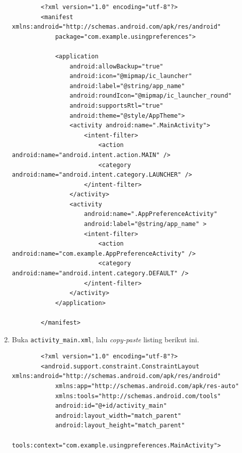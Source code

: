 \documentclass{scrartcl}
\begin{document}
\begin{enumerate}
		\begin{verbatim}
		<?xml version="1.0" encoding="utf-8"?>
		<manifest xmlns:android="http://schemas.android.com/apk/res/android"
			package="com.example.usingpreferences">
			
			<application
				android:allowBackup="true"
				android:icon="@mipmap/ic_launcher"
				android:label="@string/app_name"
				android:roundIcon="@mipmap/ic_launcher_round"
				android:supportsRtl="true"
				android:theme="@style/AppTheme">
				<activity android:name=".MainActivity">
					<intent-filter>
						<action android:name="android.intent.action.MAIN" />
						<category android:name="android.intent.category.LAUNCHER" />
					</intent-filter>
				</activity>
				<activity
					android:name=".AppPreferenceActivity"
					android:label="@string/app_name" >
					<intent-filter>
						<action android:name="com.example.AppPreferenceActivity" />
						<category android:name="android.intent.category.DEFAULT" />
					</intent-filter>
				</activity>
			</application>
		
		</manifest>
		\end{verbatim}
		
		\item Buka \texttt{activity\_main.xml}, lalu \textit{copy-paste} listing berikut ini.
		
		\begin{verbatim}
		<?xml version="1.0" encoding="utf-8"?>
		<android.support.constraint.ConstraintLayout xmlns:android="http://schemas.android.com/apk/res/android"
			xmlns:app="http://schemas.android.com/apk/res-auto"
			xmlns:tools="http://schemas.android.com/tools"
			android:id="@+id/activity_main"
			android:layout_width="match_parent"
			android:layout_height="match_parent"
			tools:context="com.example.usingpreferences.MainActivity">
			

\end{verbatim}
\end{enumerate}
\end{document}
